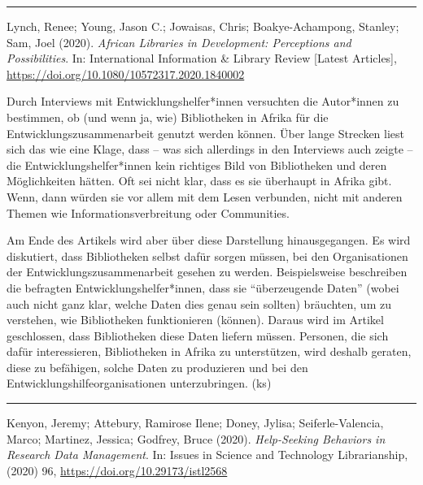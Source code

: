 \documentclass[a4paper,
fontsize=11pt,
oneside,
numbers=noperiodatend,
parskip=half-,
bibliography=totoc,
final
]{scrartcl}
\begin{document}
\begin{center}\rule{0.5\linewidth}{0.5pt}\end{center}

Lynch, Renee; Young, Jason C.; Jowaisas, Chris; Boakye-Achampong,
Stanley; Sam, Joel (2020). \emph{African Libraries in Development:
Perceptions and Possibilities}. In: International Information \& Library
Review {[}Latest Articles{]},
\url{https://doi.org/10.1080/10572317.2020.1840002}

Durch Interviews mit Entwicklungshelfer*innen versuchten die Autor*innen
zu bestimmen, ob (und wenn ja, wie) Bibliotheken in Afrika für die
Entwicklungszusammenarbeit genutzt werden können. Über lange Strecken
liest sich das wie eine Klage, dass -- was sich allerdings in den
Interviews auch zeigte -- die Entwicklungshelfer*innen kein richtiges
Bild von Bibliotheken und deren Möglichkeiten hätten. Oft sei nicht
klar, dass es sie überhaupt in Afrika gibt. Wenn, dann würden sie vor
allem mit dem Lesen verbunden, nicht mit anderen Themen wie
Informationsverbreitung oder Communities.

Am Ende des Artikels wird aber über diese Darstellung hinausgegangen. Es
wird diskutiert, dass Bibliotheken selbst dafür sorgen müssen, bei den
Organisationen der Entwicklungszusammenarbeit gesehen zu werden.
Beispielsweise beschreiben die befragten Entwicklungshelfer*innen, dass
sie \enquote{überzeugende Daten} (wobei auch nicht ganz klar, welche
Daten dies genau sein sollten) bräuchten, um zu verstehen, wie
Bibliotheken funktionieren (können). Daraus wird im Artikel geschlossen,
dass Bibliotheken diese Daten liefern müssen. Personen, die sich dafür
interessieren, Bibliotheken in Afrika zu unterstützen, wird deshalb
geraten, diese zu befähigen, solche Daten zu produzieren und bei den
Entwicklungshilfeorganisationen unterzubringen. (ks)

\begin{center}\rule{0.5\linewidth}{0.5pt}\end{center}

\pagebreak

Kenyon, Jeremy; Attebury, Ramirose Ilene; Doney, Jylisa;
Seiferle-Valencia, Marco; Martinez, Jessica; Godfrey, Bruce (2020).
\emph{Help-Seeking Behaviors in Research Data Management}. In: Issues in
Science and Technology Librarianship, (2020) 96,
\url{https://doi.org/10.29173/istl2568}
\end{document}
